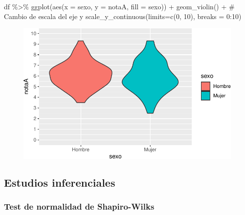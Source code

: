 \documentclass[
  a4paper,
]{scrreport}
\newenvironment{Shaded}{\begin{snugshade}}{\end{snugshade}}
\newcommand{\AttributeTok}[1]{\textcolor[rgb]{0.40,0.45,0.13}{#1}}
\newcommand{\CommentTok}[1]{\textcolor[rgb]{0.37,0.37,0.37}{#1}}
\newcommand{\DecValTok}[1]{\textcolor[rgb]{0.68,0.00,0.00}{#1}}
\newcommand{\FunctionTok}[1]{\textcolor[rgb]{0.28,0.35,0.67}{#1}}
\newcommand{\NormalTok}[1]{\textcolor[rgb]{0.00,0.23,0.31}{#1}}
\newcommand{\SpecialCharTok}[1]{\textcolor[rgb]{0.37,0.37,0.37}{#1}}
\theoremstyle{definition}
\theoremstyle{definition}
\theoremstyle{remark}
\begin{document}
\begin{Shaded}
\begin{Highlighting}[]
\NormalTok{df }\SpecialCharTok{\%\textgreater{}\%} \FunctionTok{ggplot}\NormalTok{(}\FunctionTok{aes}\NormalTok{(}\AttributeTok{x =}\NormalTok{ sexo, }\AttributeTok{y =}\NormalTok{ notaA, }\AttributeTok{fill =}\NormalTok{ sexo)) }\SpecialCharTok{+} 
  \FunctionTok{geom\_violin}\NormalTok{() }\SpecialCharTok{+}
  \CommentTok{\# Cambio de escala del eje y}
  \FunctionTok{scale\_y\_continuous}\NormalTok{(}\AttributeTok{limits=}\FunctionTok{c}\NormalTok{(}\DecValTok{0}\NormalTok{, }\DecValTok{10}\NormalTok{), }\AttributeTok{breaks =} \DecValTok{0}\SpecialCharTok{:}\DecValTok{10}\NormalTok{)}
\end{Highlighting}
\end{Shaded}

\begin{figure}[H]

{\centering \includegraphics{./08-analisis-estadisticos_files/figure-pdf/unnamed-chunk-29-1.pdf}

}

\end{figure}

\hypertarget{estudios-inferenciales-2}{%
\subsection{Estudios inferenciales}\label{estudios-inferenciales-2}}

\hypertarget{test-de-normalidad-de-shapiro-wilks}{%
\subsubsection{Test de normalidad de
Shapiro-Wilks}\label{test-de-normalidad-de-shapiro-wilks}}
\end{document}
